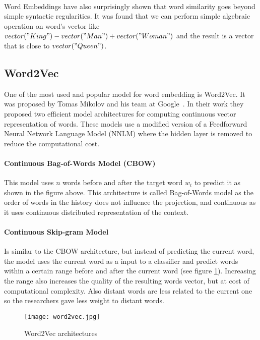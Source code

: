 \paragraph{}
Word Embeddings have also surprisingly shown that word similarity goes beyond simple syntactic regularities. It was found that we can perform simple algebraic operation on word's vector like \(vector("King")-vector("Man")+vector("Woman")\) and the result is a vector that is close to \(vector("Queen")\).

\subsection{Word2Vec}
One of the most used and popular model for word embedding is Word2Vec. It was proposed by Tomas Mikolov and his team at Google~\cite{mikolov2013efficient}. In their work they proposed two efficient model architectures for computing continuous vector representation of words. These models use a modified version of a Feedforward Neural Network Language Model (NNLM) where the hidden layer is removed to reduce the computational cost.

\paragraph{Continuous Bag-of-Words Model (CBOW)}
This model uses \(n\) words before and after the target word \(w_t\) to predict it as shown in the figure above. This architecture is called Bag-of-Words model as the order of words in the history does not influence the projection, and continuous as it uses continuous distributed representation of the context.

\paragraph{Continuous Skip-gram Model}
Is similar to the CBOW architecture, but instead of predicting the current word, the model uses the current word as a input to a classifier and predict words within a certain range before and after the current word (see figure \ref{fig:w2v}). Increasing the range also increases the quality of the resulting words vector, but at cost of computational complexity. Also distant words are less related to the current one so the researchers gave less weight to distant words.

\begin{figure}[ht]
\texttt{[image: word2vec.jpg]}
\caption{Word2Vec architectures}
\label{fig:w2v}
\end{figure}

